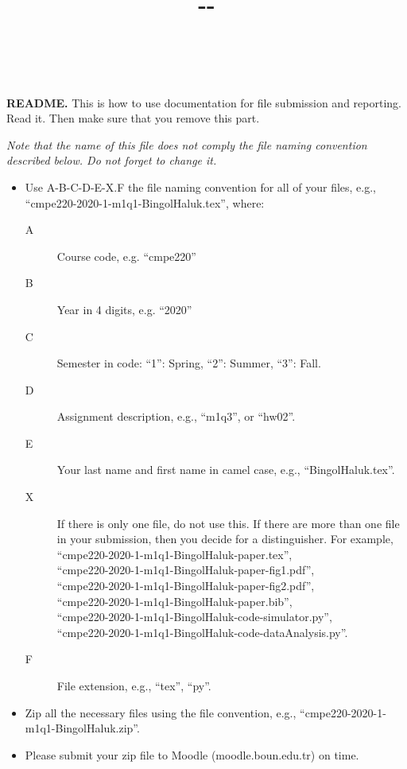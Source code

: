 \documentclass[11pt,a4]{article}
\title{
	\hbCourse-\hbWhat-\hbYou\\
	{\small 	
		\hbTimeStamp\\
	}
}
\date{}
\begin{document}
\maketitle




{\color{red} %
	\textbf{README.}
	This is how to use documentation for file submission and reporting.
	Read it.
	Then make sure that you remove this part.

	\emph{
		Note that the name of this file does not comply 
		the file naming convention described below. 
		Do not forget to change it.
	}
	
	\begin{itemize}
		
		\item 
		Use A-B-C-D-E-X.F the file naming convention for all of your files,
		e.g., ``cmpe220-2020-1-m1q1-BingolHaluk.tex'',
		where:
		\begin{description}
			
			\item[A]
			Course code, e.g. ``cmpe220'' 
			
			\item[B]
			Year in 4 digits, e.g. ``2020'' 
			
			\item[C] 
			Semester in code: ``1'': Spring, ``2'': Summer, ``3'': Fall.
			
			\item[D] 
			Assignment description, e.g., ``m1q3'', or ``hw02''.
			
			\item[E]
			Your last name and first name in camel case, e.g., ``BingolHaluk.tex''.
			
			\item[X]
			If there is only one file, do not use this.
			If there are more than one file in your submission, 
			then you decide for a distinguisher.
			For example,\\
			``cmpe220-2020-1-m1q1-BingolHaluk-paper.tex'',\\
			``cmpe220-2020-1-m1q1-BingolHaluk-paper-fig1.pdf'',\\
			``cmpe220-2020-1-m1q1-BingolHaluk-paper-fig2.pdf'',\\
			``cmpe220-2020-1-m1q1-BingolHaluk-paper.bib'',\\
			``cmpe220-2020-1-m1q1-BingolHaluk-code-simulator.py'',\\
			``cmpe220-2020-1-m1q1-BingolHaluk-code-dataAnalysis.py''.
			
			\item[F]
			File extension, e.g., ``tex'', ``py''.
		\end{description}
		
		\item 
		Zip all the necessary files using the file convention,
		e.g., ``cmpe220-2020-1-m1q1-BingolHaluk.zip''.
		
		\item 
		Please submit your zip file to Moodle (moodle.boun.edu.tr) on time.
		
	\end{itemize}
} %
\end{document}
